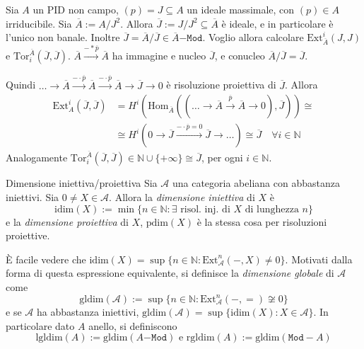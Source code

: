 \begin{example}{}
    Sia \(A\) un PID non campo, \({(p)} = J \subseteq A \) un ideale massimale,
    con \({(p)} \in A\) irriducibile. Sia \(\overline{A} := A / J^2\). Allora
    \(\overline{J} := J / J^2 \subseteq \overline{A} \) è ideale, e in
    particolare è l'unico non banale. Inoltre \(\overline{J} = \overline{A} /
    \overline{J} \in \overline{A}\mathtt{-Mod}\). Voglio allora calcolare
    \(\mathrm{Ext}_{\overline{A}}^{i}{(J, J)}\) e
    \(\mathrm{Tor}_i^{\overline{A}}{(\overline{J}, \overline{J})}\).
    \(\overline{A} \overset{-*\overline{p}}{\to} \overline{A}\) ha immagine e
    nucleo \(\overline{J}\), e conucleo \(\overline{A} / \overline{J} =
    \overline{J}\). 

    Quindi \(\dots \to \overline{A} \overset{-\cdot \overline{p}}{\to}
    \overline{A} \overset{-\cdot \overline{p}}{\to} \overline{A} \to
    \overline{J} \to 0\) è risoluzione proiettiva di \(\overline{J}\). Allora
    \begin{align*}
        \mathrm{Ext}_A^{i}{(\overline{J}, \overline{J})} &= H^{i}{\left(
      \mathrm{Hom}_{\overline{A}} {\left( {\left( \dots \to \overline{A}
\overset{\overline{p}}{\to} \overline{A} \to 0 \right)} , \overline{J} \right)}
                \right)} \cong \\ &\cong H^{i} {\left( 0 \to \overline{J} \overset{-\cdot
\overline{p}=0}{\to} \overline{J} \to \dots\right)} \cong \overline{J} \quad
\forall i \in \mathbb{N}
    \end{align*}
    Analogamente \(\mathrm{Tor}_i^{\overline{A}}{(\overline{J}, \overline{J})}
    \in \mathbb{N} \cup \{+\infty\} 
    \cong \overline{J}\), per ogni \(i \in \mathbb{N}\).
\end{example}

\begin{definition}{Dimensione iniettiva/proiettiva}
Sia \(\mathcal{A}\) una categoria abeliana con abbastanza iniettivi. Sia \(0\neq X \in
\mathcal{A}\). Allora la \emph{dimensione iniettiva} di \(X\) è
\[
  \mathrm{idim}{(X)} := \min \{n \in \mathbb{N} : \exists \text{ risol. inj. di
  \(X\) di lunghezza \(n\)}\} 
\]
e la \emph{dimensione proiettiva} di \(X\), \(\mathrm{pdim}{(X)}\)  è la stessa cosa per risoluzioni
proiettive.

È facile vedere che \(\mathrm{idim}{(X)} = \sup \{ n \in \mathbb{N} :
\mathrm{Ext}_\mathcal{A}^{n}{(-, X)} \neq 0\} \). Motivati dalla forma di questa
espressione equivalente, si definisce la \emph{dimensione globale} di
\(\mathcal{A}\) come
\[
  \mathrm{gldim}{(\mathcal{A})} := \sup \{n \in \mathbb{N} :
  \mathrm{Ext}_{\mathcal{A}}^{n}{(-, =)} \not\cong 0 \} 
\]
e se \(\mathcal{A}\) ha abbastanza iniettivi, \(\mathrm{gldim}{(\mathcal{A})} =
\sup \{ \mathrm{idim}{(X)} : X \in \mathcal{A}\} \). In particolare dato \(A\)
anello, si definiscono
\[
  \mathrm{lgldim}{(A)} := \mathrm{gldim}{(A\mathtt{-Mod})} \text{  e  }
  \mathrm{rgldim}{(A)} := \mathrm{gldim}{(\mathtt{Mod-}A)}
\]
\end{definition}

